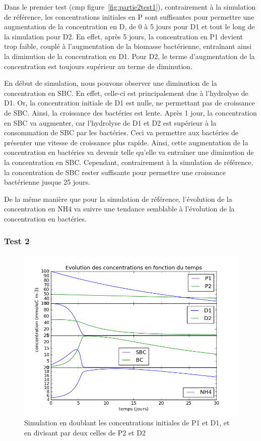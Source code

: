 \par{
Dans le premier test (cmp figure~\ref{fig:partie2test1}),
contrairement \`a la simulation de r\'ef\'erence, les concentrations initiales en P sont suffisantes pour permettre une augmentation de la concentration en D, de 0 \`a 5 jours pour D1 et tout le long de la simulation pour D2. En effet, apr\`es 5 jours, la concentration en P1 devient trop faible, coupl\'e \`a l'augmentation de la biomasse bact\'erienne, entra\^inant ainsi la diminution de la concentration en D1. Pour D2, le terme d'augmentation de la concentration est toujours sup\'erieur au terme de diminution.
}
\par{
En d\'ebut de simulation, nous pouvons observer une diminution de la concentration en SBC. En effet, celle-ci est principalement due \`a l'hydrolyse de D1. Or, la concentration initiale de D1 est nulle, ne permettant pas de croissance de SBC. Ainsi, la croissance des bact\'eries est lente. Apr\`es 1 jour, la concentration en SBC va augmenter, car l'hydrolyse de D1 et D2 est sup\'erieur \`a la consommation de SBC par les bact\'eries. Ceci va permettre aux bact\'eries de pr\'esenter une vitesse de croissance plus rapide. Ainsi, cette augmentation de la concentration en bact\'eries va devenir telle qu'elle va entra\^iner une diminution de la concentration en SBC. Cependant, contrairement \`a la simulation de r\'ef\'erence, la concentration de SBC rester suffisante pour permettre une croissance bact\'erienne jusque 25 jours.
}
\par{
De la m\^eme mani\`ere que pour la simulation de r\'ef\'erence, l'\'evolution de la concentration en NH4 va suivre une tendance semblable \`a l'\'evolution de la concentration en bact\'eries.
}

\FloatBarrier
\subsubsection{Test 2}

\begin{figure}[h!]
  \includegraphics[width=\textwidth]{partie2/Test2.png}
  \caption{Simulation en doublant les concentrations initiales de P1 et D1, et en divisant par deux celles de P2 et D2
  }
  \label{fig:partie2test2}
\end{figure}

